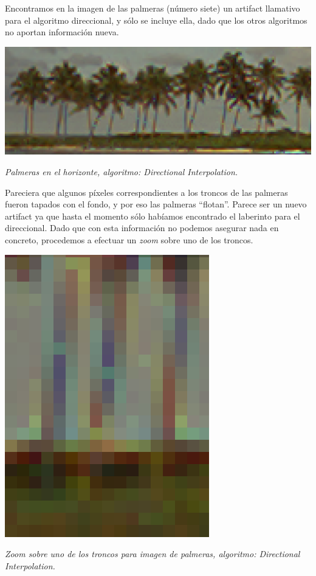 Encontramos en la imagen de las palmeras (número siete) un artifact llamativo para el algoritmo direccional, y sólo se incluye ella, dado que los otros algoritmos no aportan información nueva.

	\begin{center}
		\includegraphics[scale=.5]{../enunciado/images_files/cualitativo/palms_directional.png}
		\vspace{2pt}
		\par
		\footnotesize\textit{Palmeras en el horizonte, algoritmo: Directional Interpolation.}
	\end{center}

Pareciera que algunos píxeles correspondientes a los troncos de las palmeras fueron tapados con el fondo, y por eso las palmeras ``flotan''. Parece ser un nuevo artifact ya que hasta el momento sólo habíamos encontrado el laberinto para el direccional. Dado que con esta información no podemos asegurar nada en concreto, procedemos a efectuar un \textit{zoom} sobre uno de los troncos.

	\begin{center}
		\includegraphics[scale=.5]{../enunciado/images_files/cualitativo/palms_zoom_directional.png}
		\vspace{2pt}
		\par
		\footnotesize\textit{Zoom sobre uno de los troncos para imagen de palmeras, algoritmo: Directional Interpolation.}
	\end{center}

